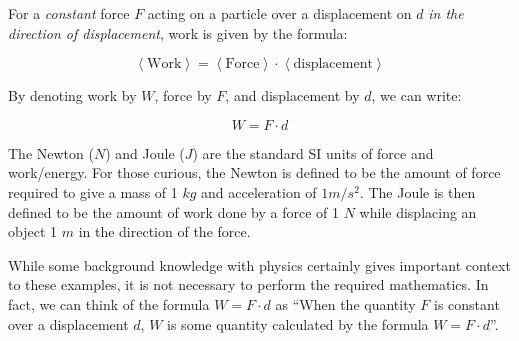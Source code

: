 \documentclass{ximera}
\begin{document}
For a \emph{constant} force $F$ acting on a particle over a displacement on $d$ \emph{in the direction of displacement}, work is given by the formula:

\[ \left<\textrm{Work} \right>=  \left<\textrm{Force} \right> \cdot \left<\textrm{displacement} \right> \]

By denoting work by $W$, force by $F$, and displacement by $d$, we can write:

\[ W = F \cdot d \]

\begin{fact}
The Newton ($N$) and Joule ($J$) are the standard SI units of force and work/energy.  For those curious, the Newton is defined to be the amount of force required to give a mass of 1 $kg$ and acceleration of $1m/s^2$.  The Joule is then defined to be the amount of work done by a force of 1 $N$ while displacing  an object 1 $m$ in the direction of the force.
\end{fact}

\begin{remark}
While some background knowledge with physics certainly gives important context to these examples, it is not necessary to perform the required mathematics.  In fact, we can think of the formula $W=F\cdot d$ as ``When the quantity $F$ is constant over a displacement $d$,  $W$ is some quantity calculated by the formula $W=F \cdot d$''.
\end{remark}
\end{document}
